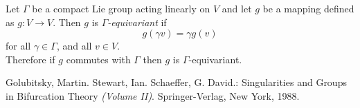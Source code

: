 \documentclass[12pt]{article}
\begin{document}
Let $\Gamma$ be a compact Lie group acting linearly on $V$ and let $g$ be a mapping defined as $g\colon V \to V$.  Then $g$ is \emph{$\Gamma$-equivariant} if $$g(\gamma v)=\gamma g(v)$$
for all $\gamma \in \Gamma$, and all $v \in V$.\\
Therefore if $g$ commutes with $\Gamma$ then $g$ is $\Gamma$-equivariant. 

\cite{1}
\begin{thebibliography}{1}
 Golubitsky, Martin. Stewart, Ian. Schaeffer, G. David.: Singularities and Groups in Bifurcation Theory \textit{(Volume II)}. Springer-Verlag, New York, 1988.
\end{thebibliography}
\end{document}
